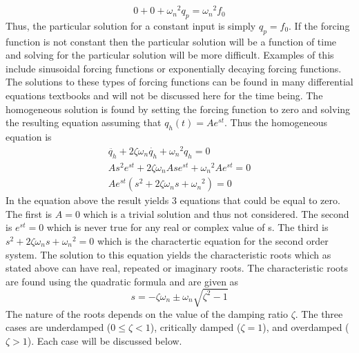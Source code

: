 \begin{equation}
    0 + 0 + {\omega_n}^2 q_p = {\omega_n}^2 f_0
\end{equation}
Thus, the particular solution for a constant input is simply $q_p = f_0$. If the forcing function is not constant then the particular solution will be a function of time and solving for the particular solution will be more difficult. Examples of this include sinusoidal forcing functions or exponentially decaying forcing functions. The solutions to these types of forcing functions can be found in many differential equations textbooks and will not be discussed here for the time being. The homogeneous solution is found by setting the forcing function to zero and solving the resulting equation assuming that $q_h(t)=Ae^{st}$. Thus the homogeneous equation is
\begin{equation}
    \begin{matrix}
    \ddot{q_h} + 2\zeta \omega_n \dot{q_h} + {\omega_n}^2 q_h = 0 \\
    A s^2 e^{st} + 2\zeta \omega_n A s e^{st} + {\omega_n}^2 A e^{st} = 0 \\
    Ae^{st}(s^2 + 2\zeta \omega_n s + {\omega_n}^2) = 0
    \end{matrix}
\end{equation}
In the equation above the result yields 3 equations that could be equal to zero. The first is $A=0$ which is a trivial solution and thus not considered. The second is $e^{st}=0$ which is never true for any real or complex value of s. The third is $s^2 + 2\zeta \omega_n s + {\omega_n}^2 = 0$ which is the charactertic equation for the second order system. The solution to this equation yields the characteristic roots which as stated above can have real, repeated or imaginary roots. The characteristic roots are found using the quadratic formula and are given as
\begin{equation}
    s = -\zeta \omega_n \pm \omega_n \sqrt{\zeta^2 - 1}
\end{equation}
The nature of the roots depends on the value of the damping ratio $\zeta$. The three cases are underdamped ($0 \leq \zeta<1$), critically damped ($\zeta=1$), and overdamped ($\zeta>1$). Each case will be discussed below.
